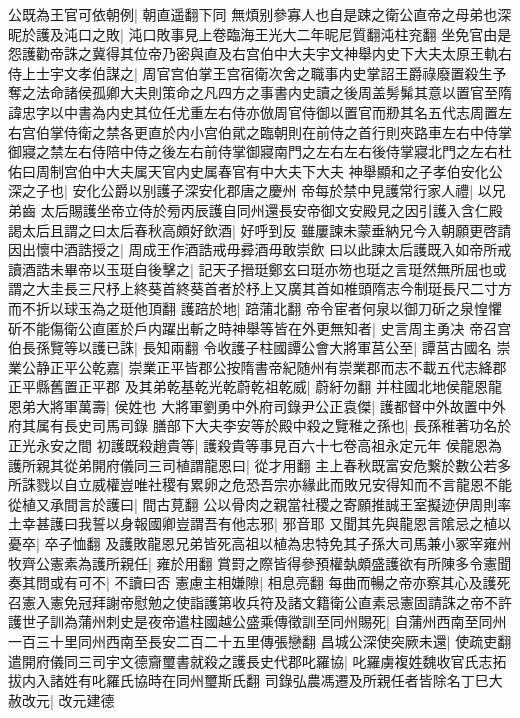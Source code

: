 公既為王官可依朝例|{
	朝直遥翻下同}
無煩别參寡人也自是踈之衛公直帝之母弟也深昵於護及沌口之敗|{
	沌口敗事見上卷臨海王光大二年昵尼質翻沌柱兖翻}
坐免官由是怨護勸帝誅之冀得其位帝乃密與直及右宫伯中大夫宇文神舉内史下大夫太原王軌右侍上士宇文孝伯謀之|{
	周官宫伯掌王宫宿衛次舍之職事内史掌詔王爵祿廢置殺生予奪之法命諸侯孤卿大夫則策命之凡四方之事書内史讀之後周盖髣髴其意以置官至隋諱忠字以中書為内史其位任尤重左右侍亦倣周官侍御以置官而剙其名五代志周置左右宫伯掌侍衛之禁各更直於内小宫伯貮之臨朝則在前侍之首行則夾路車左右中侍掌御寢之禁左右侍陪中侍之後左右前侍掌御寢南門之左右左右後侍掌寢北門之左右杜佑曰周制宫伯中大夫属天官内史属春官有中大夫下大夫}
神舉顯和之子孝伯安化公深之子也|{
	安化公爵以别護子深安化郡唐之慶州}
帝每於禁中見護常行家人禮|{
	以兄弟齒}
太后賜護坐帝立侍於㫄丙辰護自同州還長安帝御文安殿見之因引護入含仁殿謁太后且謂之曰太后春秋高頗好飲酒|{
	好呼到反}
雖屢諫未蒙垂納兄今入朝願更啓請因出懷中酒誥授之|{
	周成王作酒誥戒毋彛酒毋敢崇飲}
曰以此諫太后護既入如帝所戒讀酒誥未畢帝以玉珽自後擊之|{
	記天子搢珽鄭玄曰珽亦笏也珽之言珽然無所屈也或謂之大圭長三尺杼上終葵首終葵首者於杼上又廣其首如椎頭隋志今制珽長尺二寸方而不折以球玉為之珽他頂翻}
護踣於地|{
	踣蒲北翻}
帝令宦者何泉以御刀斫之泉惶懼斫不能傷衛公直匿於戶内躍出斬之時神舉等皆在外更無知者|{
	史言周主勇决}
帝召宫伯長孫覽等以護已誅|{
	長知兩翻}
令收護子柱國譚公會大將軍莒公至|{
	譚莒古國名}
崇業公静正平公乾嘉|{
	崇業正平皆郡公按隋書帝紀随州有崇業郡而志不載五代志絳郡正平縣舊置正平郡}
及其弟乾基乾光乾蔚乾祖乾威|{
	蔚紆勿翻}
并柱國北地侯龍恩龍恩弟大將軍萬壽|{
	侯姓也}
大將軍劉勇中外府司錄尹公正袁傑|{
	護都督中外故置中外府其属有長史司馬司錄}
膳部下大夫李安等於殿中殺之覽稚之孫也|{
	長孫稚著功名於正光永安之間}
初護既殺趙貴等|{
	護殺貴等事見百六十七卷高祖永定元年}
侯龍恩為護所親其從弟開府儀同三司植謂龍恩曰|{
	從才用翻}
主上春秋既富安危繋於數公若多所誅戮以自立威權豈唯社稷有累卵之危恐吾宗亦緣此而敗兄安得知而不言龍恩不能從植又承間言於護曰|{
	間古莧翻}
公以骨肉之親當社稷之寄願推誠王室擬迹伊周則率土幸甚護曰我誓以身報國卿豈謂吾有他志邪|{
	邪音耶}
又聞其先與龍恩言隂忌之植以憂卒|{
	卒子恤翻}
及護敗龍恩兄弟皆死高祖以植為忠特免其子孫大司馬兼小冢宰雍州牧齊公憲素為護所親任|{
	雍於用翻}
賞罸之際皆得參預權埶頗盛護欲有所陳多令憲聞奏其問或有可不|{
	不讀曰否}
憲慮主相嫌隙|{
	相息亮翻}
每曲而暢之帝亦察其心及護死召憲入憲免冠拜謝帝慰勉之使詣護第收兵符及諸文籍衛公直素忌憲固請誅之帝不許護世子訓為蒲州刺史是夜帝遣柱國越公盛乘傳徵訓至同州賜死|{
	自蒲州西南至同州一百三十里同州西南至長安二百二十五里傳張戀翻}
昌城公深使突厥未還|{
	使疏吏翻}
遣開府儀同三司宇文德齎璽書就殺之護長史代郡叱羅協|{
	叱羅虜複姓魏收官氏志拓拔内入諸姓有叱羅氏協時在同州璽斯氏翻}
司錄弘農馮遷及所親任者皆除名丁巳大赦改元|{
	改元建德}
